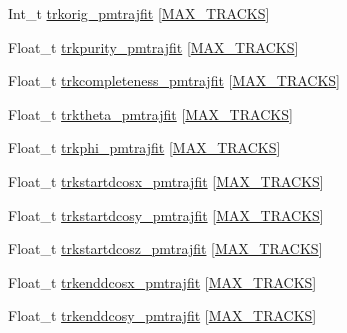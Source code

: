 \begin{DoxyCompactItemize}
\item 
Int\-\_\-t \hyperlink{classanatree_af73683d3cd8d9744249a2e982e8d368e}{trkorig\-\_\-pmtrajfit} \mbox{[}\hyperlink{anatree__core__v09410002_8h_a327fd4e796e4a0d78947524c96e4362e}{M\-A\-X\-\_\-\-T\-R\-A\-C\-K\-S}\mbox{]}
\item 
Float\-\_\-t \hyperlink{classanatree_ad62e41cc71946eba049a853e9e661d7d}{trkpurity\-\_\-pmtrajfit} \mbox{[}\hyperlink{anatree__core__v09410002_8h_a327fd4e796e4a0d78947524c96e4362e}{M\-A\-X\-\_\-\-T\-R\-A\-C\-K\-S}\mbox{]}
\item 
Float\-\_\-t \hyperlink{classanatree_a976a694f65f7f57d49f1565b2cc002f4}{trkcompleteness\-\_\-pmtrajfit} \mbox{[}\hyperlink{anatree__core__v09410002_8h_a327fd4e796e4a0d78947524c96e4362e}{M\-A\-X\-\_\-\-T\-R\-A\-C\-K\-S}\mbox{]}
\item 
Float\-\_\-t \hyperlink{classanatree_ae5ad98ca775aae6971d1aacb0581eb38}{trktheta\-\_\-pmtrajfit} \mbox{[}\hyperlink{anatree__core__v09410002_8h_a327fd4e796e4a0d78947524c96e4362e}{M\-A\-X\-\_\-\-T\-R\-A\-C\-K\-S}\mbox{]}
\item 
Float\-\_\-t \hyperlink{classanatree_a6db840bbaff1fe7965232ec3548a2da9}{trkphi\-\_\-pmtrajfit} \mbox{[}\hyperlink{anatree__core__v09410002_8h_a327fd4e796e4a0d78947524c96e4362e}{M\-A\-X\-\_\-\-T\-R\-A\-C\-K\-S}\mbox{]}
\item 
Float\-\_\-t \hyperlink{classanatree_a8acce8ecb09cdf3b6b4dcacf732ff21d}{trkstartdcosx\-\_\-pmtrajfit} \mbox{[}\hyperlink{anatree__core__v09410002_8h_a327fd4e796e4a0d78947524c96e4362e}{M\-A\-X\-\_\-\-T\-R\-A\-C\-K\-S}\mbox{]}
\item 
Float\-\_\-t \hyperlink{classanatree_acd3ee8ea7c8c818eedc2f0ebc92545a4}{trkstartdcosy\-\_\-pmtrajfit} \mbox{[}\hyperlink{anatree__core__v09410002_8h_a327fd4e796e4a0d78947524c96e4362e}{M\-A\-X\-\_\-\-T\-R\-A\-C\-K\-S}\mbox{]}
\item 
Float\-\_\-t \hyperlink{classanatree_a8364a06165a45dab496f635602256c8c}{trkstartdcosz\-\_\-pmtrajfit} \mbox{[}\hyperlink{anatree__core__v09410002_8h_a327fd4e796e4a0d78947524c96e4362e}{M\-A\-X\-\_\-\-T\-R\-A\-C\-K\-S}\mbox{]}
\item 
Float\-\_\-t \hyperlink{classanatree_a7ff6f93928b5a3e1a618ffda2e6f5886}{trkenddcosx\-\_\-pmtrajfit} \mbox{[}\hyperlink{anatree__core__v09410002_8h_a327fd4e796e4a0d78947524c96e4362e}{M\-A\-X\-\_\-\-T\-R\-A\-C\-K\-S}\mbox{]}
\item 
Float\-\_\-t \hyperlink{classanatree_a48b831c5c0b76ebd1f5cfea2e89be249}{trkenddcosy\-\_\-pmtrajfit} \mbox{[}\hyperlink{anatree__core__v09410002_8h_a327fd4e796e4a0d78947524c96e4362e}{M\-A\-X\-\_\-\-T\-R\-A\-C\-K\-S}\mbox{]}

\end{DoxyCompactItemize}
